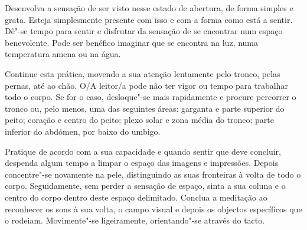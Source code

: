 Desenvolva a sensação de ser visto nesse estado de abertura, de forma simples e grata. Esteja simplesmente presente com isso e com a forma como está a sentir. Dê"-se tempo para sentir e disfrutar da sensação de se encontrar num espaço benevolente. Pode ser benéfico imaginar que se encontra na luz, numa temperatura amena ou na água.

Continue esta prática, movendo a sua atenção lentamente pelo tronco, pelas pernas, até ao chão. O/A leitor/a pode não ter vigor ou tempo para trabalhar todo o corpo. Se for o caso, desloque"-se mais rapidamente e procure percorrer o tronco ou, pelo menos, uma das seguintes áreas: garganta e parte superior do peito; coração e centro do peito; plexo solar e zona média do tronco; parte inferior do abdómen, por baixo do umbigo.

Pratique de acordo com a sua capacidade e quando sentir que deve concluir, despenda algum tempo a limpar o espaço das imagens e impressões. Depois concentre"-se novamente na pele, distinguindo as suas fronteiras à volta de todo o corpo. Seguidamente, sem perder a sensação de espaço, sinta a sua coluna e o centro do corpo dentro deste espaço delimitado. Conclua a meditação ao reconhecer os sons à sua volta, o campo visual e depois os objectos específicos que o rodeiam. Movimente"-se ligeiramente, orientando"-se através do tacto.
